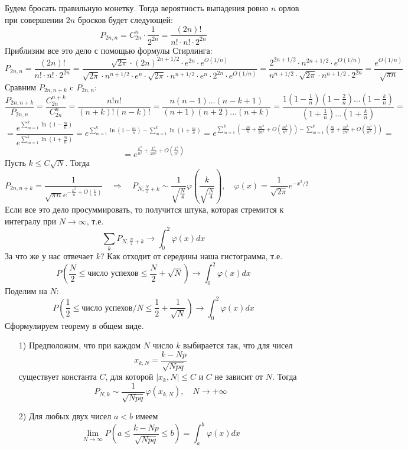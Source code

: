 Будем бросать правильную монетку. Тогда вероятность выпадения ровно $n$ орлов при совершении $2n$ бросков будет следующей:
\[
    P_{2n, n} = C_{2n}^n \cdot \frac{1}{2^{2n}} = \frac{(2n)!}{n! \cdot n! \cdot 2^{2n}}
\]
Приблизим все это дело с помощью формулы Стирлинга:
\[
    P_{2n, n} = \frac{(2n)!}{n! \cdot n! \cdot 2^{2n}} =
    \frac{
        \sqrt{2\pi} \cdot (2n)^{2n + 1/2} \cdot e^{2n} \cdot e^{O(1/n)}
    }{
        \sqrt{2\pi} \cdot n^{n + 1/2} \cdot e^{n} \cdot
        \sqrt{2\pi} \cdot n^{n + 1/2} \cdot e^{n} \cdot
        2^{2n}  \cdot e^{O(1/n)}
    } =
    \frac{
        2^{2n + 1/2} \cdot n^{2n + 1/2}  \cdot e^{O(1/n)}
    }{
        n^{n + 1/2} \cdot
        \sqrt{2\pi} \cdot n^{n + 1/2} \cdot
        2^{2n}
    } =
    \frac{
        e^{O(1/n)}
    }{
        \sqrt{\pi n}
    }
\]
Сравним $P_{2n, n+k}$ c $P_{2n, n}$:
\[
    \frac{P_{2n, n+k}}{P_{2n, n}} = \frac{C_{2n}^{n+k}}{C_{2n}^n} = \frac{n! n!}{(n+k)!(n-k)!}
    =
    \frac{n(n-1) ... (n-k+1)}{(n+1)(n+2)...(n+k)} = \frac{1(1 - \frac{1}{n})(1 - \frac{2}{n})...(1-\frac{k}{n})}{(1 + \frac{1}{n})...(1 + \frac{k}{n})} = 
\]
\[
    = \frac{e^{\sum_{m=1}^k \ln(1 - \frac{m}{n})}}{e^{\sum_{m=1}^k \ln(1 + \frac{m}{n})}} =
    e^{\sum_{m=1}^k \ln(1 - \frac{m}{n}) - \sum_{m=1}^k \ln(1 + \frac{m}{n})} =
    e^{\sum_{m=1}^k (-\frac{m}{n} + \frac{m^2}{2n^2} + O(\frac{m^3}{n^3})) - \sum_{m=1}^k (\frac{m}{n} + \frac{m^2}{2n^2} + O(\frac{m^3}{n^3}))} =
\]
\[
    = e^{\frac{k^2}{n^2} + \frac{k^2}{2n^2} + O(\frac{k^4}{n^3})}
\]
Пусть $k \leqslant C \sqrt{N}$. Тогда
\[
    P_{2n, n+k} = \frac{1}{\sqrt{\pi n} e^{-\frac{k^2}{n} + O(\frac{1}{n})}}
    \quad \Rightarrow \quad
    P_{N, \frac{N}{2} + k} \sim \frac{1}{\sqrt{\frac{N}{4}}} \varphi(\frac{k}{\sqrt{\frac{N}{4}}}), 
    \quad
    \varphi(x) = \frac{1}{\sqrt{2\pi}} e^{-x^2/2}
\]
Если все это дело просуммировать, то получится штука, которая стремится к интегралу при $N \to \infty$, т.е.
\[
   \sum_k  P_{N, \frac{N}{2} + k} \to \int_0^2 \varphi(x) dx
\]
За что же у нас отвечает $k$? Как отходит от середины наша гистограмма, т.е.
\[
    P(\frac{N}{2} \leqslant \text{число успехов} \leqslant \frac{N}{2} + \sqrt{N} ) \to \int_0^2 \varphi(x) dx
\]
Поделим на $N$:
\[
    P(\frac{1}{2} \leqslant \text{число успехов}/N \leqslant \frac{1}{2} + \frac{1}{\sqrt{N}} ) \to \int_0^2 \varphi(x) dx
\]
Сформулируем теорему в общем виде.
\begin{theorem}
    \begin{itemize}
        \item[1)] Предположим, что при каждом $N$ число $k$ выбирается так, что для чисел $$x_{k, N} = \frac{k - Np}{\sqrt{Npq}}$$ существует константа $C$, для которой $|x_k,N| \leqslant C$ и $C$ не зависит от $N$. Тогда 
        \[
            P_{N, k} \sim \frac{1}{\sqrt{Npq}}\varphi(x_{k,N}), \quad N \to +\infty
        \]
        \item[2)] Для любых двух чисел $a < b$ имеем
        \[
            \lim_{N \to \infty} P(a \leqslant \frac{k - Np}{\sqrt{Npq}} \leqslant b) = \int_a^b \varphi(x) dx
        \] 
    \end{itemize}
\end{theorem}

